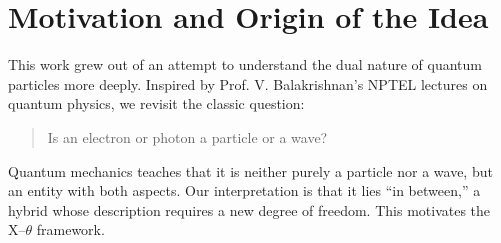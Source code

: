 \section{Motivation and Origin of the Idea}

This work grew out of an attempt to understand the dual nature of quantum
particles more deeply. Inspired by Prof. V. Balakrishnan's NPTEL lectures \cite{BalakrishnanNPTEL} on
quantum physics, we revisit the classic question:

\begin{quote}
Is an electron or photon a particle or a wave?
\end{quote}

Quantum mechanics teaches that it is neither purely a particle nor a wave, but
an entity with both aspects. Our interpretation is that it lies ``in between,''
a hybrid whose description requires a new degree of freedom. This motivates the
X--$\theta$ framework.
